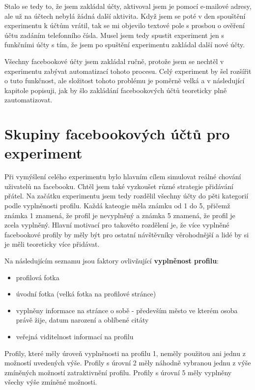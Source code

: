 \documentclass[thesis=M,czech]{FITthesis}[2013/05/10]
\begin{document}
Stalo se tedy to, že jsem zakládal účty, aktivoval jsem je pomocí e-mailové adresy, ale už na účtech nebylá žádná další aktivita. Když jsem se poté v den spouštění experimentu k účtům vrátil, tak se mi objevilo textové pole s prosbou o ověření účtu zadáním telefonního čísla. Musel jsem tedy spustit experiment jen s funkčními účty s tím, že jsem po spuštění experimentu zakládal další nové účty.

Všechny facebookové účty jsem zakládal ručně, protože jsem se nechtěl v experimentu zabývat automatizací tohoto procesu. Celý experiment by šel rozšířit o tuto funkčnost, ale složitost tohoto problému je poměrně velká a v následující kapitole popisuji, jak by šlo zakládání facebookových účtů teoreticky plně zautomatizovat.

\section{Skupiny facebookových účtů pro experiment}

Při vymýšlení celého experimentu bylo hlavním cílem simulovat reálné chování uživatelů na facebooku. Chtěl jsem také vyzkoušet různé strategie přidávání přátel. Na začátku experimentu jsem tedy rozdělil všechny účty do pěti kategorií podle vyplněnosti profilu. Každá kateogie měla známku od 1 do 5, přičemž známka 1 znamená, že profil je nevyplněný a známka 5 znamená, že profil je zcela vyplněný. Hlavní motivací pro takovéto rozdělení je, že více vyplněné facebookové profily by měly být pro ostatní návštěvníky věrohodnější a lidé by si je měli teoreticky více přidávat.

Na následujícím seznamu jsou faktory ovlivňující \textbf{vyplněnost profilu}:

\begin{itemize}
  \item profilová fotka
  \item úvodní fotka (velká fotka na profilové stránce)
  \item vyplněny informace na stránce o sobě - především město ve kterém osoba právě žije, datum narození a oblíbené citáty
  \item veřejná viditelnost informací na profilu
\end{itemize}

Profily, které měly úroveň vyplněnosti na profilu 1, neměly použitou ani jednu z možností uvedených výše. Profily s úrovní 2 měly náhodně vybranou jednu z výše zmíněných možností zatraktivnění profilu. Profily s úrovní 5 měly vyplněny všechy výše zmíněné možnosti.
\end{document}
